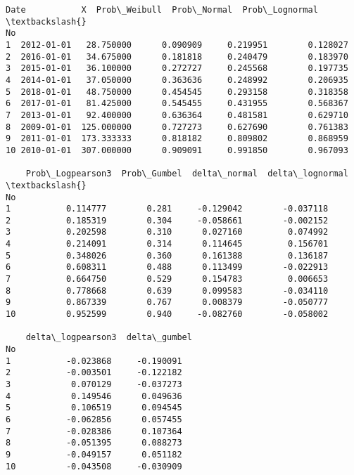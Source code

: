\documentclass[11pt]{article}
\makeatletter
\newcommand{\boxspacing}{\kern\kvtcb@left@rule\kern\kvtcb@boxsep}
\newcommand{\prompt}[4]{
        {\ttfamily\llap{{\color{#2}[#3]:\hspace{3pt}#4}}\vspace{-\baselineskip}}
    }
\makeatother
\begin{document}
            \begin{tcolorbox}[breakable, size=fbox, boxrule=.5pt, pad at break*=1mm, opacityfill=0]
\prompt{Out}{outcolor}{ }{\boxspacing}
\begin{Verbatim}[commandchars=\\\{\}]
         Date           X  Prob\_Weibull  Prob\_Normal  Prob\_Lognormal  \textbackslash{}
No
1  2012-01-01   28.750000      0.090909     0.219951        0.128027
2  2016-01-01   34.675000      0.181818     0.240479        0.183970
3  2015-01-01   36.100000      0.272727     0.245568        0.197735
4  2014-01-01   37.050000      0.363636     0.248992        0.206935
5  2018-01-01   48.750000      0.454545     0.293158        0.318358
6  2017-01-01   81.425000      0.545455     0.431955        0.568367
7  2013-01-01   92.400000      0.636364     0.481581        0.629710
8  2009-01-01  125.000000      0.727273     0.627690        0.761383
9  2011-01-01  173.333333      0.818182     0.809802        0.868959
10 2010-01-01  307.000000      0.909091     0.991850        0.967093

    Prob\_Logpearson3  Prob\_Gumbel  delta\_normal  delta\_lognormal  \textbackslash{}
No
1           0.114777        0.281     -0.129042        -0.037118
2           0.185319        0.304     -0.058661        -0.002152
3           0.202598        0.310      0.027160         0.074992
4           0.214091        0.314      0.114645         0.156701
5           0.348026        0.360      0.161388         0.136187
6           0.608311        0.488      0.113499        -0.022913
7           0.664750        0.529      0.154783         0.006653
8           0.778668        0.639      0.099583        -0.034110
9           0.867339        0.767      0.008379        -0.050777
10          0.952599        0.940     -0.082760        -0.058002

    delta\_logpearson3  delta\_gumbel
No
1           -0.023868     -0.190091
2           -0.003501     -0.122182
3            0.070129     -0.037273
4            0.149546      0.049636
5            0.106519      0.094545
6           -0.062856      0.057455
7           -0.028386      0.107364
8           -0.051395      0.088273
9           -0.049157      0.051182
10          -0.043508     -0.030909
\end{Verbatim}
\end{tcolorbox}
        
\end{document}
